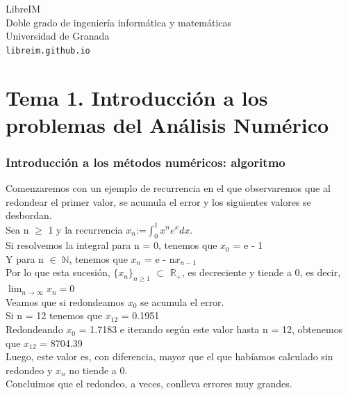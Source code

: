 \documentclass[10pt, a4paper]{article}
\theoremstyle{theorem-style}
\theoremstyle{definition-style}
\theoremstyle{remark-style}
\theoremstyle{example-style}
\theoremstyle{definition-style}
\theoremstyle{remark-style}
\newcommand{\asignatura}{%
  Métodos\\
  numéricos I\\
}
\newcommand{\autor}{LibreIM}
\newcommand{\grado}{Doble grado de ingeniería informática y matemáticas}
\newcommand{\universidad}{Universidad de Granada}
\newcommand{\enlaceweb}{libreim.github.io}
\begin{document}
\begin{titlepage}

	\parbox[t]{\textwidth}{
			\raggedright %
			\fontsize{50pt}{50pt}\selectfont\sffamily\color{500}{
			  \textbf{\asignatura}
      }
	}

	\vfill

	\parbox[t]{\textwidth}{
		\raggedright %
		\sffamily\large
		{\Large \autor}\\[4pt]
		\grado\\
		\universidad\\[4pt]
		\texttt{\enlaceweb}
	}

\end{titlepage}


\thispagestyle{empty}
\tableofcontents
\newpage


\part{Tema 1. Introducción a los problemas del Análisis Numérico}


\section{Introducción a los métodos numéricos: algoritmo}
Comenzaremos con un ejemplo de recurrencia en el que observaremos que al redondear el primer valor, se acumula el error y los siguientes valores se desbordan.\\
Sea n $\geq$ 1 y la recurrencia $x_{n}$:=$\int_{0}^{1} x^{n}e^{x}dx$.\\
Si resolvemos la integral para n = 0, tenemos que $x_{0}$ = e - 1\\
Y para n $\in$ $\mathbb{N}$, tenemos que $x_{n}$ = e - n$x_{n-1}$\\
Por lo que esta sucesión, $\lbrace x_{n} \rbrace_{n\geq1}$ $\subset$ $\mathbb{R_{+}}$, es decreciente y tiende a 0, es decir, $ \lim_{n \to \infty} x_{n} = 0 $ \\
Veamos que si redondeamos $x_{0}$ se acumula el error.\\
Si n = 12 tenemos que $x_{12}$ = 0.1951\\
Redondeando $x_{0}$ = 1.7183 e iterando según este valor hasta n = 12, obtenemos que $x_{12}$ = 8704.39\\
Luego, este valor es, con diferencia, mayor que el que habíamos calculado sin redondeo y $x_{n}$ no tiende a 0.\\
Concluimos que el redondeo, a veces, conlleva errores muy grandes.
\end{document}

